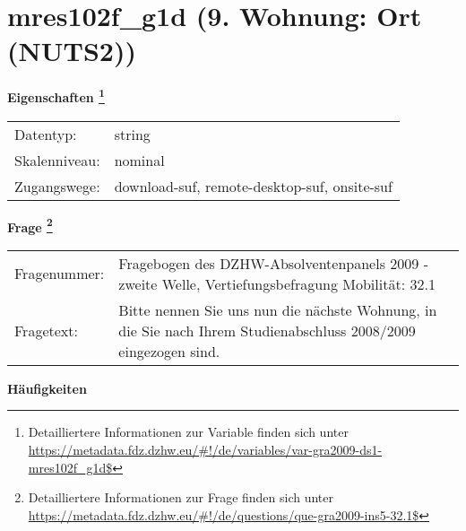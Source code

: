
    \setcounter{footnote}{0}

    \vspace*{-1.8cm}
	\section{mres102f\_g1d (9. Wohnung: Ort (NUTS2))}
	\label{section:mres102f_g1d}



    \vspace*{0.5cm}
    \noindent\textbf{Eigenschaften
	\footnote{Detailliertere Informationen zur Variable finden sich unter
		\url{https://metadata.fdz.dzhw.eu/\#!/de/variables/var-gra2009-ds1-mres102f_g1d$}}}\\
	\begin{tabularx}{\hsize}{@{}lX}
	Datentyp: & string \\
	Skalenniveau: & nominal \\
	Zugangswege: &
	  download-suf, 
	  remote-desktop-suf, 
	  onsite-suf
 \\
    \end{tabularx}



				\vspace*{0.5cm}
                \noindent\textbf{Frage
	                \footnote{Detailliertere Informationen zur Frage finden sich unter
		              \url{https://metadata.fdz.dzhw.eu/\#!/de/questions/que-gra2009-ins5-32.1$}}}\\
				\begin{tabularx}{\hsize}{@{}lX}
					Fragenummer: &
					  Fragebogen des DZHW-Absolventenpanels 2009 - zweite Welle, Vertiefungsbefragung Mobilität:
					  32.1
 \\
					Fragetext: & Bitte nennen Sie uns nun die nächste Wohnung, in die Sie nach Ihrem Studienabschluss 2008/2009 eingezogen sind. \\
				\end{tabularx}





        		\vspace*{0.5cm}
                \noindent\textbf{Häufigkeiten}

